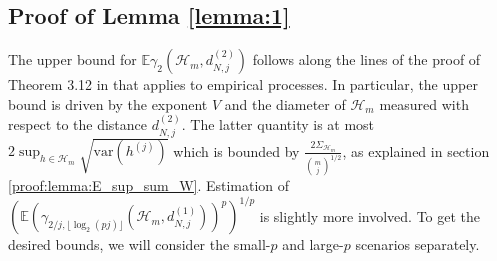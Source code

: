 \documentclass[12pt]{article}
\newcommand\var{\mathrm{var}}
\def\l{\left}
\def\r{\right}
\newcommand{\m}{\mathcal}
\newcommand{\mb}{\mathbb}
\theoremstyle{thmstyletwo}%
\theoremstyle{thmstylethree}%
\begin{document}
    

\subsection{Proof of Lemma \ref{lemma:1}}
\label{proof:lemma:1}

The upper bound for $\mb E\gamma_{2} \l(\mathcal{H}_m, d^{(2)}_{N,j}\r)$ follows along the lines of the proof of Theorem 3.12 in \cite{koltchinskii2011oracle} that applies to empirical processes. In particular, the upper bound is driven by the exponent $V$ and the diameter of $\mathcal{H}_m$ measured with respect to the distance $d^{(2)}_{N,j}$. The latter quantity is at most $2\sup_{h \in \mathcal{H}_m}\sqrt{\var\l(h^{(j)}\r)}$ which is bounded by $\frac{2\Sigma_{\m H_m}}{{m \choose j}^{1/2}}$, as explained in section \ref{proof:lemma:E_sup_sum_W}. 
Estimation of $\l(\mb E \l(\gamma_{2/j, \lfloor \log_2 (pj) \rfloor} (\mathcal{H}_m, d_{N,j}^{(1)}) \r)^p\r)^{1/p}$ is slightly more involved. To get the desired bounds, we will consider the small-$p$ and large-$p$ scenarios separately. 
\end{document}
